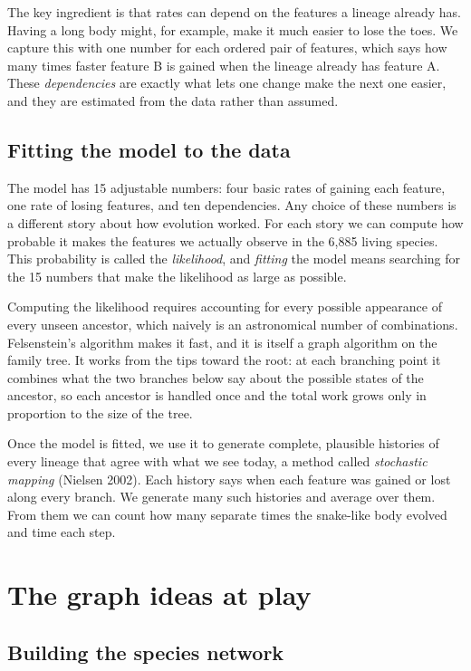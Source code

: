 \documentclass[11pt]{article}
\begin{document}
The key ingredient is that rates can depend on the features a lineage already has. Having a long body might, for example, make it much easier to lose the toes. We capture this with one number for each ordered pair of features, which says how many times faster feature B is gained when the lineage already has feature A. These \emph{dependencies} are exactly what lets one change make the next one easier, and they are estimated from the data rather than assumed.

\subsection{Fitting the model to the data}

The model has 15 adjustable numbers: four basic rates of gaining each feature, one rate of losing features, and ten dependencies. Any choice of these numbers is a different story about how evolution worked. For each story we can compute how probable it makes the features we actually observe in the 6,885 living species. This probability is called the \emph{likelihood}, and \emph{fitting} the model means searching for the 15 numbers that make the likelihood as large as possible.

Computing the likelihood requires accounting for every possible appearance of every unseen ancestor, which naively is an astronomical number of combinations. Felsenstein's algorithm makes it fast, and it is itself a graph algorithm on the family tree. It works from the tips toward the root: at each branching point it combines what the two branches below say about the possible states of the ancestor, so each ancestor is handled once and the total work grows only in proportion to the size of the tree.

Once the model is fitted, we use it to generate complete, plausible histories of every lineage that agree with what we see today, a method called \emph{stochastic mapping} (Nielsen 2002). Each history says when each feature was gained or lost along every branch. We generate many such histories and average over them. From them we can count how many separate times the snake-like body evolved and time each step.

\section{The graph ideas at play}

\subsection{Building the species network}
\end{document}
